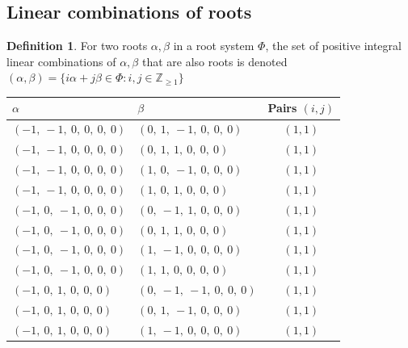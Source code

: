 \documentclass[11pt]{article}
\theoremstyle{definition}
\newtheorem{definition}{Definition}[section]
\begin{document}
\subsection{Linear combinations of roots}

\begin{definition}
For two roots $\alpha, \beta$ in a root system $\Phi$, the set of positive integral linear combinations of $\alpha, \beta$ that are also roots is denoted
\(
	(\alpha, \beta) = \{ i \alpha + j \beta \in \Phi : i, j \in \mathbb{Z}_{\ge 1} \}
\)
\end{definition}

\begin{center}
\begin{tabular}{|l|l|c|}
    \hline
    $\alpha$ & $\beta$ & Pairs $(i,j)$ \\
    \hline
    $\left( -1, \  -1, \  0, \  0, \  0, \  0\right)$ & $\left( 0, \  1, \  -1, \  0, \  0, \  0\right)$ & $(1,1)$ \\
    \hline
    $\left( -1, \  -1, \  0, \  0, \  0, \  0\right)$ & $\left( 0, \  1, \  1, \  0, \  0, \  0\right)$ & $(1,1)$ \\
    \hline
    $\left( -1, \  -1, \  0, \  0, \  0, \  0\right)$ & $\left( 1, \  0, \  -1, \  0, \  0, \  0\right)$ & $(1,1)$ \\
    \hline
    $\left( -1, \  -1, \  0, \  0, \  0, \  0\right)$ & $\left( 1, \  0, \  1, \  0, \  0, \  0\right)$ & $(1,1)$ \\
    \hline
    $\left( -1, \  0, \  -1, \  0, \  0, \  0\right)$ & $\left( 0, \  -1, \  1, \  0, \  0, \  0\right)$ & $(1,1)$ \\
    \hline
    $\left( -1, \  0, \  -1, \  0, \  0, \  0\right)$ & $\left( 0, \  1, \  1, \  0, \  0, \  0\right)$ & $(1,1)$ \\
    \hline
    $\left( -1, \  0, \  -1, \  0, \  0, \  0\right)$ & $\left( 1, \  -1, \  0, \  0, \  0, \  0\right)$ & $(1,1)$ \\
    \hline
    $\left( -1, \  0, \  -1, \  0, \  0, \  0\right)$ & $\left( 1, \  1, \  0, \  0, \  0, \  0\right)$ & $(1,1)$ \\
    \hline
    $\left( -1, \  0, \  1, \  0, \  0, \  0\right)$ & $\left( 0, \  -1, \  -1, \  0, \  0, \  0\right)$ & $(1,1)$ \\
    \hline
    $\left( -1, \  0, \  1, \  0, \  0, \  0\right)$ & $\left( 0, \  1, \  -1, \  0, \  0, \  0\right)$ & $(1,1)$ \\
    \hline
    $\left( -1, \  0, \  1, \  0, \  0, \  0\right)$ & $\left( 1, \  -1, \  0, \  0, \  0, \  0\right)$ & $(1,1)$ \\

\end{tabular}
\end{center}
\end{document}
